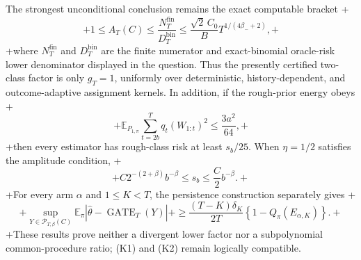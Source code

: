 The strongest unconditional conclusion remains the exact computable bracket
+\[
+1\le A_T(C)\le\frac{N_T^{\mathrm{fin}}}{D_T^{\mathrm{bin}}}\le\frac{\sqrt{2}\,C_0}{B}T^{1/(4\beta_-+2)},
+\]
+where \(N_T^{\mathrm{fin}}\) and \(D_T^{\mathrm{bin}}\) are the finite numerator and exact-binomial oracle-risk lower denominator displayed in the question. Thus the presently certified two-class factor is only \(g_T=1\), uniformly over deterministic, history-dependent, and outcome-adaptive assignment kernels. In addition, if the rough-prior energy obeys
+\[
+\mathbb E_{P_{1,\pi}}\sum_{t=2b}^Tq_t(W_{1:t})^2\le\frac{3a^2}{64},
+\]
+then every estimator has rough-class risk at least \(s_b/25\). When \(\eta=1/2\) satisfies the amplitude condition,
+\[
+C2^{-(2+\beta)}b^{-\beta}\le s_b\le\frac{C}{2}b^{-\beta}.
+\]
+For every arm \(\alpha\) and \(1\le K<T\), the persistence construction separately gives
+\[
+\sup_{Y\in\mathcal P_{T,\beta}(C)}\mathbb E_\pi\left|\widehat\theta-\operatorname{GATE}_T(Y)\right|
+\ge\frac{(T-K)\delta_K}{2T}\left\{1-Q_\pi(E_{\alpha,K})\right\}.
+\]
+These results prove neither a divergent lower factor nor a subpolynomial common-procedure ratio; (K1) and (K2) remain logically compatible.